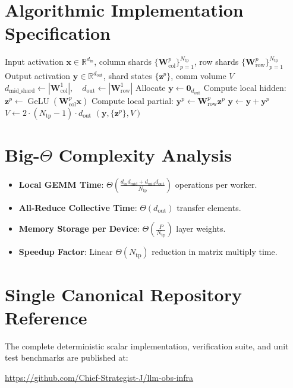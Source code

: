 \documentclass[11pt,a4paper]{article}
\theoremstyle{definition}
\begin{document}
\section{Algorithmic Implementation Specification}

\begin{algorithm}[H]
\caption{Megatron Column-Row Tensor Parallelism Forward Step}
\begin{algorithmic}[1]
\Require Input activation $\mathbf{x} \in \mathbb{R}^{d_{\text{in}}}$, column shards $\{\mathbf{W}_{\text{col}}^p\}_{p=1}^{N_{\text{tp}}}$, row shards $\{\mathbf{W}_{\text{row}}^p\}_{p=1}^{N_{\text{tp}}}$
\Ensure Output activation $\mathbf{y} \in \mathbb{R}^{d_{\text{out}}}$, shard states $\{\mathbf{z}^p\}$, comm volume $V$
\State $d_{\text{mid\_shard}} \gets |\mathbf{W}_{\text{col}}^1|, \quad d_{\text{out}} \gets |\mathbf{W}_{\text{row}}^1|$
\State Allocate $\mathbf{y} \gets \mathbf{0}_{d_{\text{out}}}$
    \State Compute local hidden: $\mathbf{z}^p \gets \operatorname{GeLU}(\mathbf{W}_{\text{col}}^p \mathbf{x})$
    \State Compute local partial: $\mathbf{y}^p \gets \mathbf{W}_{\text{row}}^p \mathbf{z}^p$
    \State $\mathbf{y} \gets \mathbf{y} + \mathbf{y}^p$ 
\EndFor
\State $V \gets 2 \cdot (N_{\text{tp}} - 1) \cdot d_{\text{out}}$
\State \Return $(\mathbf{y}, \{\mathbf{z}^p\}, V)$
\end{algorithmic}
\end{algorithm}

\section{Big-$\Theta$ Complexity Analysis}

\begin{itemize}
    \item \textbf{Local GEMM Time}: $\Theta\left(\frac{d_{\text{in}} d_{\text{mid}} + d_{\text{mid}} d_{\text{out}}}{N_{\text{tp}}}\right)$ operations per worker.
    \item \textbf{All-Reduce Collective Time}: $\Theta(d_{\text{out}})$ transfer elements.
    \item \textbf{Memory Storage per Device}: $\Theta\left(\frac{P}{N_{\text{tp}}}\right)$ layer weights.
    \item \textbf{Speedup Factor}: Linear $\Theta(N_{\text{tp}})$ reduction in matrix multiply time.
\end{itemize}

\section{Single Canonical Repository Reference}

The complete deterministic scalar implementation, verification suite, and unit test benchmarks are published at:
\begin{center}
\url{https://github.com/Chief-Strategist-J/llm-obs-infra}
\end{center}
\end{document}

